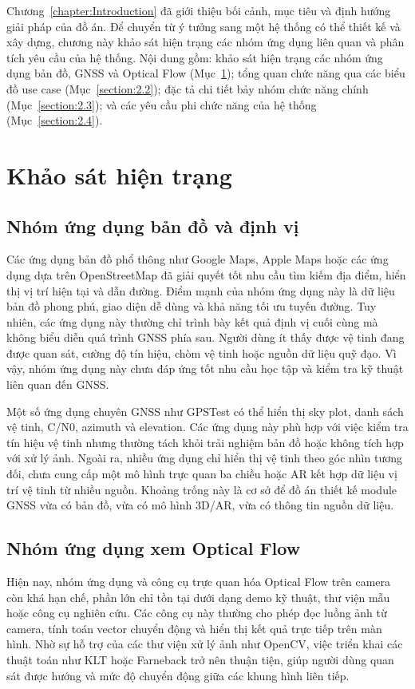 \documentclass[../DoAn.tex]{subfiles}
\begin{document}
Chương~\ref{chapter:Introduction} đã giới thiệu bối cảnh, mục tiêu và định hướng giải pháp của đồ án. Để chuyển từ ý tưởng sang một hệ thống có thể thiết kế và xây dựng, chương này khảo sát hiện trạng các nhóm ứng dụng liên quan và phân tích yêu cầu của hệ thống. Nội dung gồm: khảo sát hiện trạng các nhóm ứng dụng bản đồ, GNSS và Optical Flow (Mục~\ref{section:2.1}); tổng quan chức năng qua các biểu đồ use case (Mục~\ref{section:2.2}); đặc tả chi tiết bảy nhóm chức năng chính (Mục~\ref{section:2.3}); và các yêu cầu phi chức năng của hệ thống (Mục~\ref{section:2.4}).

\section{Khảo sát hiện trạng}
\label{section:2.1}
\subsection{Nhóm ứng dụng bản đồ và định vị}
\label{subsection:2.1.1}
Các ứng dụng bản đồ phổ thông như Google Maps, Apple Maps hoặc các ứng dụng dựa trên OpenStreetMap đã giải quyết tốt nhu cầu tìm kiếm địa điểm, hiển thị vị trí hiện tại và dẫn đường. Điểm mạnh của nhóm ứng dụng này là dữ liệu bản đồ phong phú, giao diện dễ dùng và khả năng tối ưu tuyến đường. Tuy nhiên, các ứng dụng này thường chỉ trình bày kết quả định vị cuối cùng mà không biểu diễn quá trình GNSS phía sau. Người dùng ít thấy được vệ tinh đang được quan sát, cường độ tín hiệu, chòm vệ tinh hoặc nguồn dữ liệu quỹ đạo. Vì vậy, nhóm ứng dụng này chưa đáp ứng tốt nhu cầu học tập và kiểm tra kỹ thuật liên quan đến GNSS.

Một số ứng dụng chuyên GNSS như GPSTest có thể hiển thị sky plot, danh sách vệ tinh, C/N0, azimuth và elevation. Các ứng dụng này phù hợp với việc kiểm tra tín hiệu vệ tinh nhưng thường tách khỏi trải nghiệm bản đồ hoặc không tích hợp với xử lý ảnh. Ngoài ra, nhiều ứng dụng chỉ hiển thị vệ tinh theo góc nhìn tương đối, chưa cung cấp một mô hình trực quan ba chiều hoặc AR kết hợp dữ liệu vị trí vệ tinh từ nhiều nguồn. Khoảng trống này là cơ sở để đồ án thiết kế module GNSS vừa có bản đồ, vừa có mô hình 3D/AR, vừa có thông tin nguồn dữ liệu.

\subsection{Nhóm ứng dụng xem Optical Flow}
\label{subsection:2.1.2}
Hiện nay, nhóm ứng dụng và công cụ trực quan hóa Optical Flow trên camera còn khá hạn chế, phần lớn chỉ tồn tại dưới dạng demo kỹ thuật, thư viện mẫu hoặc công cụ nghiên cứu. Các công cụ này thường cho phép đọc luồng ảnh từ camera, tính toán vector chuyển động và hiển thị kết quả trực tiếp trên màn hình. Nhờ sự hỗ trợ của các thư viện xử lý ảnh như OpenCV, việc triển khai các thuật toán như KLT hoặc Farneback trở nên thuận tiện, giúp người dùng quan sát được hướng và mức độ chuyển động giữa các khung hình liên tiếp.
\end{document}
